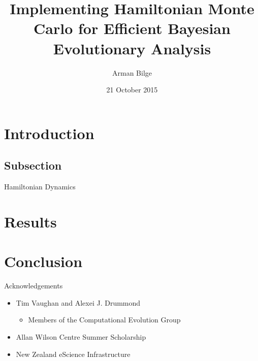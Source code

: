 \documentclass{beamer}
\title[HMC]{Implementing Hamiltonian Monte Carlo for Efficient Bayesian Evolutionary Analysis}
\author{Arman Bilge}
\institute{Computational Evolution Group \\ The University of Auckland}
\date{21 October 2015}
\begin{document}
    \frame{\titlepage}

    \section{Introduction}

    \subsection{Subsection}
    \begin{frame}{Hamiltonian Dynamics}

    \end{frame}

    \section{Results}

    \section{Conclusion}

    \begin{frame}{Acknowledgements}
        \begin{itemize}
            \item Tim Vaughan and Alexei J. Drummond
            \begin{itemize}
                \item Members of the Computational Evolution Group
            \end{itemize}
            \item Allan Wilson Centre Summer Scholarship
            \item New Zealand eScience Infrastructure
        \end{itemize}
    \end{frame}
\end{document}

